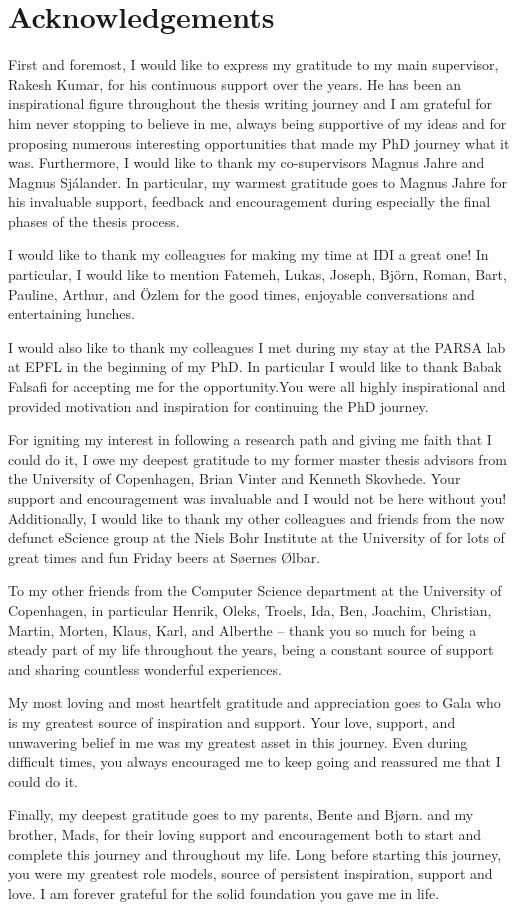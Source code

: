 \documentclass[../main.tex]{subfiles}
\begin{document}
\chapter{Acknowledgements}

First and foremost, I would like to express my gratitude to my main
supervisor, Rakesh Kumar, for his continuous support over the
years. He has been an inspirational figure throughout the thesis
writing journey and I am grateful for him never stopping to believe in
me, always being supportive of my ideas and for proposing numerous
interesting opportunities that made my PhD journey what it
was. Furthermore, I would like to thank my co-supervisors Magnus Jahre
and Magnus Sjálander. In particular, my warmest gratitude goes to
Magnus Jahre for his invaluable support, feedback and encouragement
during especially the final phases of the thesis process.

I would like to thank my colleagues for making my time at IDI a
great one! In particular, I would like to mention Fatemeh, Lukas,
Joseph, Björn, Roman, Bart, Pauline, Arthur, and Özlem for the good
times, enjoyable conversations and entertaining lunches.

I would also like to thank my colleagues I met during my stay at the
PARSA lab at EPFL in the beginning of my PhD. In particular I would
like to thank Babak Falsafi for accepting me for the opportunity.You
were all highly inspirational and provided motivation and inspiration
for continuing the PhD journey.

For igniting my interest in following a research path and giving me
faith that I could do it, I owe my deepest gratitude to my former
master thesis advisors from the University of Copenhagen, Brian Vinter
and Kenneth Skovhede. Your support and encouragement was invaluable and I would not be here without you! Additionally, I would like to thank my other colleagues and friends from the now defunct eScience group at the Niels Bohr Institute at the University of for lots of great times and fun Friday beers at Søernes Ølbar.

To my other friends from the Computer Science department at the
University of Copenhagen, in particular Henrik, Oleks, Troels, Ida,
Ben, Joachim, Christian, Martin, Morten, Klaus, Karl, and Alberthe --
thank you so much for being a steady part of my life throughout the
years, being a constant source of support and sharing countless
wonderful experiences.

My most loving and most heartfelt gratitude and appreciation goes to
Gala who is my greatest source of inspiration and support. Your love,
support, and unwavering belief in me was my greatest asset in this
journey. Even during difficult times, you always encouraged me to keep
going and reassured me that I could do it.

Finally, my deepest gratitude goes to my parents, Bente and Bjørn. and
my brother, Mads, for their loving support and encouragement both to
start and complete this journey and throughout my life. Long before
starting this journey, you were my greatest role models, source of
persistent inspiration, support and love. I am forever grateful for
the solid foundation you gave me in life.

\newpage
\end{document}

